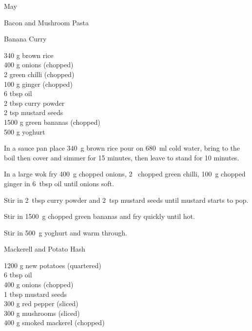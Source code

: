 \begin{menu}{May}
\begin{recipe}{1}{Bacon and Mushroom Pasta}
\begin{instructions}
    \end{instructions}
    \end{recipe}%
  
    \begin{recipe}{2}{Banana Curry}%
		\begin{ingredients}
		340 g brown rice  \\
	400 g onions (chopped) \\
	2  green chilli (chopped) \\
	100 g ginger (chopped) \\
	6 tbsp oil  \\
	2 tbsp curry powder  \\
	2 tsp mustard seeds  \\
	1500 g green bananas (chopped) \\
	500 g yoghurt  \\
	
		\end{ingredients}
	
	
	
    \begin{instructions}
    \item 
    In a
    sauce pan
    place
    340~g  brown rice
    pour on
    680~ml  cold water,
    bring to the boil then cover and simmer for 15 minutes,
    then leave to stand for 10 minutes.
  \item 
        In a large wok fry
        400~g chopped onions,
        2~ chopped green chilli,
        100~g chopped ginger
        in
        6~tbsp  oil
        until onions soft.
      \item 
        Stir in
        2~tbsp  curry powder
        and
        2~tsp  mustard seeds
        until mustard starts to pop.
      \item 
        Stir in
        1500~g chopped green bananas
        and fry quickly until hot.
      \item 
        Stir in 500~g  yoghurt and warm through.
      
    \end{instructions}
    \end{recipe}%
  
    \begin{recipe}{2}{Mackerell and Potato Hash}%
		\begin{ingredients}
		1200 g new potatoes (quartered) \\
	6 tbsp oil  \\
	400 g onions (chopped) \\
	1 tbsp mustard seeds  \\
	300 g red pepper (sliced) \\
	300 g mushrooms (sliced) \\
	400 g smoked mackerel (chopped) \\
	

\end{ingredients}
\end{recipe}
\end{menu}
